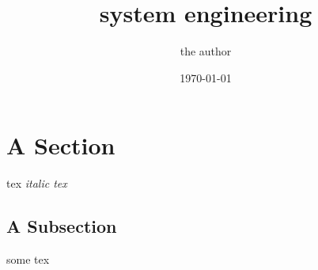 \documentclass{article}%
\title{system engineering}%
\author{the author}%
\date{\today}%
\begin{document}
%
\normalsize%
\maketitle%
\section{A Section}%
\label{sec:A Section}%
tex%
\textit{italic tex}%
\subsection{A Subsection}%
\label{subsec:A Subsection}%
some tex

%
\end{document}
